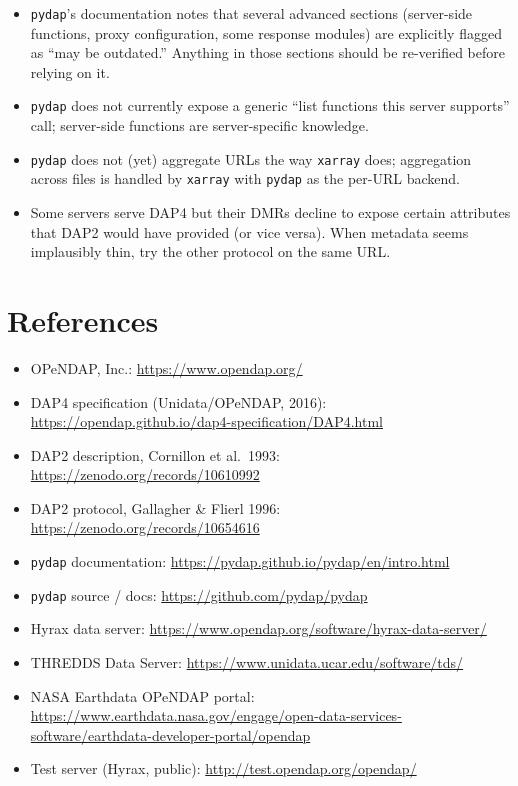 \documentclass[11pt]{article}
\begin{document}
\begin{itemize}
  \item \texttt{pydap}'s documentation notes that several advanced
    sections (server-side functions, proxy configuration, some
    response modules) are explicitly flagged as ``may be outdated.''
    Anything in those sections should be re-verified before
    relying on it.
  \item \texttt{pydap} does not currently expose a generic
    ``list functions this server supports'' call; server-side
    functions are server-specific knowledge.
  \item \texttt{pydap} does not (yet) aggregate URLs the way
    \texttt{xarray} does; aggregation across files is handled by
    \texttt{xarray} with \texttt{pydap} as the per-URL backend.
  \item Some servers serve DAP4 but their DMRs decline to expose
    certain attributes that DAP2 would have provided (or vice
    versa). When metadata seems implausibly thin, try the other
    protocol on the same URL.
\end{itemize}

\section{References}

\begin{itemize}
  \item OPeNDAP, Inc.: \url{https://www.opendap.org/}
  \item DAP4 specification (Unidata/OPeNDAP, 2016):
    \url{https://opendap.github.io/dap4-specification/DAP4.html}
  \item DAP2 description, Cornillon et al.\ 1993:
    \url{https://zenodo.org/records/10610992}
  \item DAP2 protocol, Gallagher \& Flierl 1996:
    \url{https://zenodo.org/records/10654616}
  \item \texttt{pydap} documentation:
    \url{https://pydap.github.io/pydap/en/intro.html}
  \item \texttt{pydap} source / docs:
    \url{https://github.com/pydap/pydap}
  \item Hyrax data server:
    \url{https://www.opendap.org/software/hyrax-data-server/}
  \item THREDDS Data Server:
    \url{https://www.unidata.ucar.edu/software/tds/}
  \item NASA Earthdata OPeNDAP portal:
    \url{https://www.earthdata.nasa.gov/engage/open-data-services-software/earthdata-developer-portal/opendap}
  \item Test server (Hyrax, public):
    \url{http://test.opendap.org/opendap/}
\end{itemize}
\end{document}
